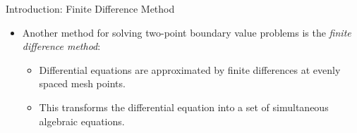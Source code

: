 \documentclass{beamer}
\begin{document}
\begin{frame}{Introduction: Finite Difference Method}
    \begin{itemize}
        \item Another method for solving two-point boundary value problems is the \textit{finite difference method}:
        \begin{itemize}
            \item Differential equations are approximated by finite differences at evenly spaced mesh points.
            \item This transforms the differential equation into a set of simultaneous algebraic equations.
        \end{itemize}   
    \end{itemize}
\end{frame}
\end{document}

